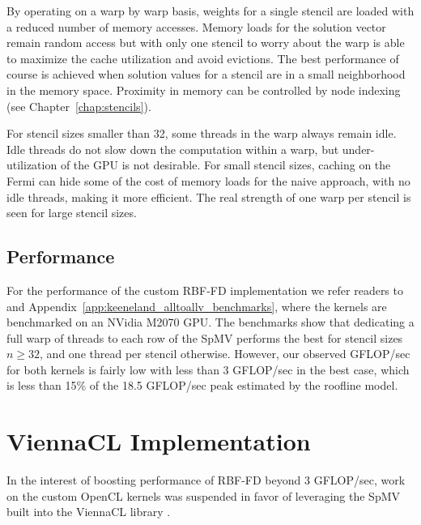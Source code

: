 \documentclass{report}
\begin{document}
By operating on a warp by warp basis, weights for a single stencil are loaded with a reduced number of memory accesses. Memory loads for the solution vector remain random access but with only one stencil to worry about the warp is able to maximize the cache utilization and avoid evictions. The best performance of course is achieved when solution values for a stencil are in a small neighborhood in the memory space. Proximity in memory can be controlled by node indexing (see Chapter~\ref{chap:stencils}). 

For stencil sizes smaller than 32, some threads in the warp always remain idle. Idle threads do not slow down the computation within a warp, but under-utilization of the GPU is not desirable. For small stencil sizes, caching on the Fermi can hide some of the cost of memory loads for the naive approach, with no idle threads, making it more efficient. The real strength of one warp per stencil is seen for large stencil sizes. 

\subsection{Performance}

For the performance of the custom RBF-FD implementation we refer readers to \cite{BolligFlyerErlebacher2012} and Appendix~\ref{app:keeneland_alltoallv_benchmarks}, where the kernels are benchmarked on an NVidia M2070 GPU. The benchmarks show that dedicating a full warp of threads to each row of the SpMV performs the best for stencil sizes $n \geq 32$, and one thread per stencil otherwise. However, our observed GFLOP/sec for both kernels is fairly low with less than 3 GFLOP/sec in the best case, which is less than 15\% of the 18.5 GFLOP/sec peak estimated by the roofline model. 



\section{ViennaCL Implementation} 


In the interest of boosting performance of RBF-FD beyond 3 GFLOP/sec, work on the custom OpenCL kernels was suspended in favor of leveraging the SpMV built into the ViennaCL library \cite{Rupp2010, Rupp2010a}.  
\end{document}
